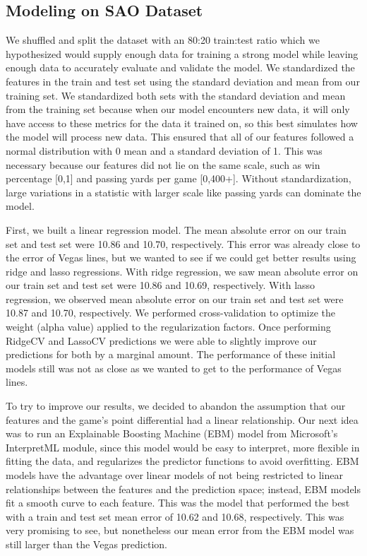 \documentclass{article}
\begin{document}
\begin{multicols}{2}
\subsection{Modeling on SAO Dataset}
We shuffled and split the dataset with an 80:20 train:test ratio which we hypothesized would supply enough data for training a strong model while leaving enough data to accurately evaluate and validate the model. We standardized the features in the train and test set using the standard deviation and mean from our training set. We standardized both sets with the standard deviation and mean from the training set because when our model encounters new data, it will only have access to these metrics for the data it trained on, so this best simulates how the model will process new data. This ensured that all of our features followed a normal distribution with 0 mean and a standard deviation of 1.  This was necessary because our features did not lie on the same scale, such as win percentage [0,1] and passing yards per game [0,400+]. Without standardization, large variations in a statistic with larger scale like passing yards can dominate the model.

First, we built a linear regression model. The mean absolute error on our train set and test set were 10.86 and 10.70, respectively.  This error was already close to the error of Vegas lines, but we wanted to see if we could get better results using ridge and lasso regressions. With ridge regression, we saw mean absolute error on our train set and test set were 10.86 and 10.69, respectively. With lasso regression, we observed mean absolute error on our train set and test set were 10.87 and 10.70, respectively. We performed cross-validation to optimize the weight (alpha value) applied to the regularization factors. Once performing RidgeCV and LassoCV predictions we were able to slightly improve our predictions for both by a marginal amount. The performance of these initial models still was not as close as we wanted to get to the performance of Vegas lines.

To try to improve our results, we decided to abandon the assumption that our features and the game’s point differential had a linear relationship. Our next idea was to run an Explainable Boosting Machine (EBM) model from Microsoft’s InterpretML module, since this model would be easy to interpret, more flexible in fitting the data, and regularizes the predictor functions to avoid overfitting. EBM models have the advantage over linear models of not being restricted to linear relationships between the features and the prediction space; instead, EBM models fit a smooth curve to each feature. This was the model that performed the best with a train and test set mean error of 10.62 and 10.68, respectively. This was very promising to see, but nonetheless our mean error from the EBM model was still larger than the Vegas prediction.

\end{multicols}
\end{document}
